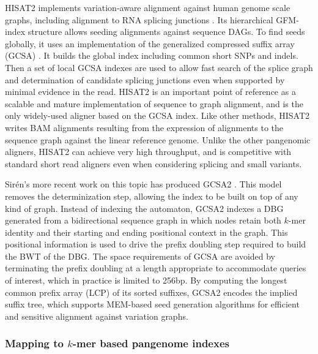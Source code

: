 HISAT2 implements variation-aware alignment against human genome scale graphs, including alignment to RNA splicing junctions \cite{kim2017hisat2}.
Its hierarchical GFM-index structure allows seeding alignments against sequence DAGs.
To find seeds globally, it uses an implementation of the generalized compressed suffix array (GCSA) \cite{siren2011indexing}.
It builds the global index including common short SNPs and indels.
Then a set of local GCSA indexes are used to allow fast search of the splice graph and determination of candidate splicing junctions even when supported by minimal evidence in the read.
HISAT2 is an important point of reference as a scalable and mature implementation of sequence to graph alignment, and is the only widely-used aligner based on the GCSA index.
Like other methods, HISAT2 writes BAM alignments resulting from the expression of alignments to the sequence graph against the linear reference genome.
Unlike the other pangenomic aligners, HISAT2 can achieve very high throughput, and is competitive with standard short read aligners even when considering splicing and small variants.

Sir\'{e}n's more recent work on this topic has produced GCSA2 \cite{siren2017indexing}.
This model removes the determinization step, allowing the index to be built on top of any kind of graph.
Instead of indexing the automaton, GCSA2 indexes a DBG generated from a bidirectional sequence graph in which nodes retain both $k$-mer identity and their starting and ending positional context in the graph.
This positional information is used to drive the prefix doubling step required to build the BWT of the DBG.
The space requirements of GCSA are avoided by terminating the prefix doubling at a length appropriate to accommodate queries of interest, which in practice is limited to 256bp.
By computing the longest common prefix array (LCP) of its sorted suffixes, GCSA2 encodes the implied suffix tree, which supports MEM-based seed generation algorithms for efficient and sensitive alignment against variation graphs.

\subsubsection{Mapping to $k$-mer based pangenome indexes}

